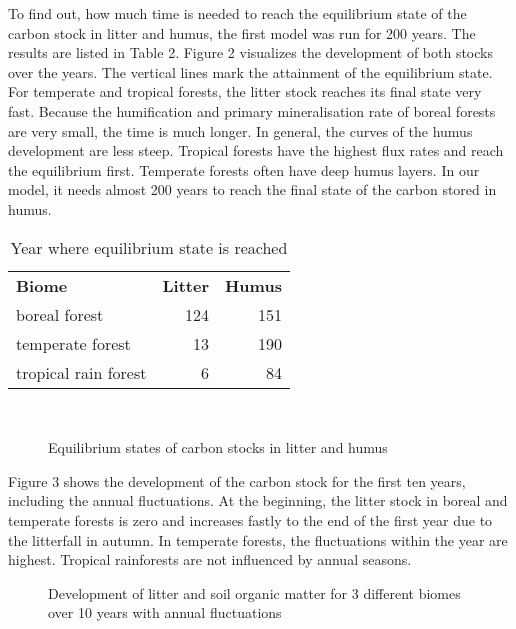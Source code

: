\documentclass[10pt, a4paper]{article}
\begin{document}
	 	 	 	 	
To find out, how much time is needed to reach the equilibrium state of the carbon stock in litter and humus, the first model was run for 200 years. The results are listed in Table 2.  Figure 2 visualizes the development of both stocks over the years. The vertical lines mark the attainment of the equilibrium state. For temperate and tropical forests, the litter stock reaches its final state very fast. Because the humification and primary mineralisation rate of boreal forests are very small, the time is much longer. In general, the curves of the humus development are less steep. Tropical forests have the highest flux rates and reach the equilibrium first. Temperate forests often have deep humus layers. In our model, it needs almost 200 years to reach the final state of the carbon stored in humus.\\

\begin{table}[htbp!]
	\begin{center}
		\caption{Year where equilibrium state is reached}
		\label{tab:table1}
		\begin{tabular}{l r r} %
			\textbf{Biome}& \textbf{Litter} & \textbf{Humus}\\
			boreal forest & 124 & 151\\
			temperate forest& 13 & 190\\
			tropical rain forest& 6 & 84\\
		\end{tabular}
	\end{center}
\end{table}\

\begin{figure}[!htbp]
	\centering
	\caption{Equilibrium states of carbon stocks in litter and humus}
\end{figure}

Figure 3 shows the development of the carbon stock for the first ten years, including the annual fluctuations. At the beginning, the litter stock in boreal and temperate forests is zero and increases fastly to the end of the first year due to the litterfall in autumn. In temperate forests, the fluctuations within the year are highest. Tropical rainforests are not influenced by annual seasons. \newpage

\begin{figure}[!htbp]
	\centering
	\caption{Development of litter and soil organic matter for 3 different biomes over 10 years with annual fluctuations}
\end{figure}
\end{document}

